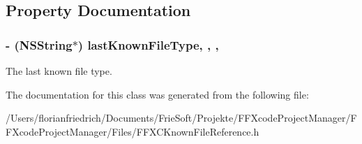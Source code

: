 \subsection{Property Documentation}
\hypertarget{interface_f_f_x_c_known_file_reference_a52fb7d9158293b6d026617ce0093fc5a}{
\subsubsection[{last\-Known\-File\-Type}]{\setlength{\rightskip}{0pt plus 5cm}-\/ (N\-S\-String$\ast$) last\-Known\-File\-Type\hspace{0.3cm}{\ttfamily [read]}, {\ttfamily [write]}, {\ttfamily [nonatomic]}, {\ttfamily [strong]}}}\label{interface_f_f_x_c_known_file_reference_a52fb7d9158293b6d026617ce0093fc5a}
The last known file type. 

The documentation for this class was generated from the following file\-:\begin{DoxyCompactItemize}
\item 
/\-Users/florianfriedrich/\-Documents/\-Frie\-Soft/\-Projekte/\-F\-F\-Xcode\-Project\-Manager/\-F\-F\-Xcode\-Project\-Manager/\-Files/F\-F\-X\-C\-Known\-File\-Reference.\-h\end{DoxyCompactItemize}
